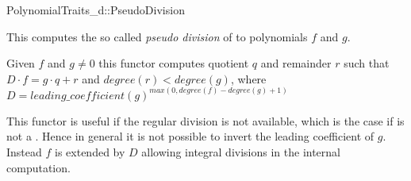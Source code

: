 \begin{ccRefConcept}{PolynomialTraits_d::PseudoDivision}

\ccDefinition

This  computes the so called {\em pseudo division} 
of to polynomials $f$ and $g$. 
     
Given $f$ and $g \neq 0$ this functor computes quotient $q$ and
remainder $r$ such that $D \cdot f = g \cdot q + r$ and $degree(r) < degree(g)$,
where $ D = leading\_coefficient(g)^{max(0, degree(f)-degree(g)+1)}$

This functor is useful if the regular division is not available, 
which is the case if  is not a . 
Hence in general it is not possible to invert the leading coefficient of $g$. 
Instead $f$ is extended by $D$ allowing integral divisions in the internal 
computation. 


\ccRefines 
{}

\ccTypes


\ccGlue

\ccOperations



\ccSeeAlso

\\
\\
\\
\\
\\

\end{ccRefConcept}